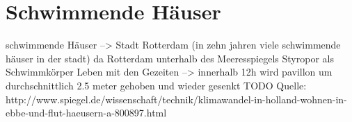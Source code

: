 \section{Schwimmende Häuser}

schwimmende Häuser
--> Stadt Rotterdam	(in zehn jahren viele schwimmende häuser in der stadt)
da Rotterdam unterhalb des Meeresspiegels
\newline\newline
Styropor als Schwimmkörper
\newline\newline
Leben mit den Gezeiten
--> innerhalb 12h wird pavillon um durchschnittlich 2.5 meter gehoben und wieder gesenkt
\newline\newline
TODO
Quelle: http://www.spiegel.de/wissenschaft/technik/klimawandel-in-holland-wohnen-in-ebbe-und-flut-haeusern-a-800897.html